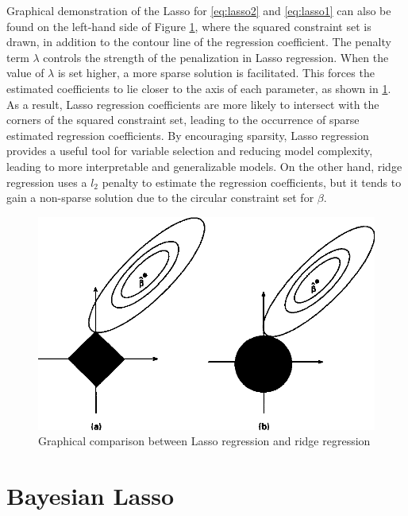 Graphical demonstration of the Lasso for \autoref{eq:lasso2} and \autoref{eq:lasso1} can also be found on the left-hand side of Figure \ref{fig:lassodemo}, where the squared constraint set is drawn, in addition to the contour line of the regression coefficient. The penalty term $\lambda$ controls the strength of the penalization in Lasso regression. When the value of $\lambda$ is set higher, a more sparse solution is facilitated. This forces the estimated coefficients to lie closer to the axis of each parameter, as shown in \ref{fig:lassodemo}. As a result, Lasso regression coefficients are more likely to intersect with the corners of the squared constraint set, leading to the occurrence of sparse estimated regression coefficients. By encouraging sparsity, Lasso regression provides a useful tool for variable selection and reducing model complexity, leading to more interpretable and generalizable models. On the other hand, ridge regression uses a $l_2$ penalty to estimate the regression coefficients, but it tends to gain a non-sparse solution due to the circular constraint set for $\beta$.\
\begin{figure}
	\includegraphics[width=\linewidth]{lassodemo}
	\caption{Graphical comparison between Lasso regression and ridge regression}
	\label{fig:lassodemo}
\end{figure}
\section{Bayesian Lasso}
